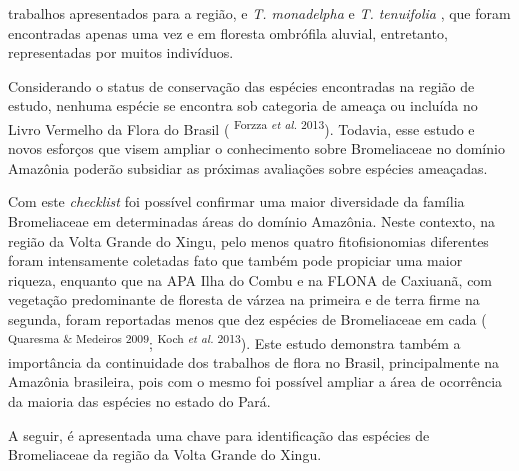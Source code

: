 \begin{multicols}{2}
trabalhos apresentados para a região,\allowbreak{} e \textit{T.\allowbreak{} monadelpha} e \textit{T.\allowbreak{} tenuifolia },\allowbreak{} que foram encontradas apenas uma vez e em floresta ombrófila aluvial,\allowbreak{} entretanto,\allowbreak{} representadas por muitos indivíduos.\allowbreak{}\par{}Considerando o status de conservação das espécies encontradas na região de estudo,\allowbreak{} nenhuma espécie se encontra sob categoria de ameaça ou incluída no Livro Vermelho da Flora do Brasil (\allowbreak{} \textsuperscript{Forzza \textit{et al.\allowbreak{}} 2013})\allowbreak{}.\allowbreak{} Todavia,\allowbreak{} esse estudo e novos esforços que visem ampliar o conhecimento sobre Bromeliaceae no domínio Amazônia poderão subsidiar as próximas avaliações sobre espécies ameaçadas.\allowbreak{}\par{}Com este \textit{checklist} foi possível confirmar uma maior diversidade da família Bromeliaceae em determinadas áreas do domínio Amazônia.\allowbreak{} Neste contexto,\allowbreak{} na região da Volta Grande do Xingu,\allowbreak{} pelo menos quatro fitofisionomias diferentes foram intensamente coletadas fato que também pode propiciar uma maior riqueza,\allowbreak{} enquanto que na APA Ilha do Combu e na FLONA de Caxiuanã,\allowbreak{} com vegetação predominante de floresta de várzea na primeira e de terra firme na segunda,\allowbreak{} foram reportadas menos que dez espécies de Bromeliaceae em cada (\allowbreak{} \textsuperscript{Quaresma \&\allowbreak{\allowbreak{}\allowbreak{}}\allowbreak{} Medeiros 2009}; \textsuperscript{Koch \textit{et al.\allowbreak{}} 2013})\allowbreak{}.\allowbreak{} Este estudo demonstra também a importância da continuidade dos trabalhos de flora no Brasil,\allowbreak{} principalmente na Amazônia brasileira,\allowbreak{} pois com o mesmo foi possível ampliar a área de ocorrência da maioria das espécies no estado do Pará.\allowbreak{}\par{}A seguir,\allowbreak{} é apresentada uma chave para identificação das espécies de Bromeliaceae da região da Volta Grande do Xingu.\allowbreak{}
\end{multicols}
\par{}
